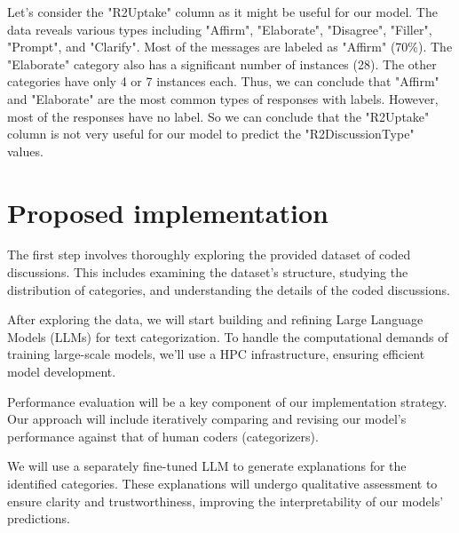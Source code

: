 \documentclass[fleqn,moreauthors,10pt]{ds_report}
\begin{document}


Let’s consider the "R2Uptake" column as it might be useful for our model. The data reveals various types including "Affirm", "Elaborate", "Disagree", "Filler", "Prompt", and "Clarify". Most of the messages are labeled as "Affirm" (70\%). The "Elaborate" category also has a significant number of instances (28). The other categories have only 4 or 7 instances each. Thus, we can conclude that "Affirm" and "Elaborate" are the most common types of responses with labels. However, most of the responses have no label. So we can conclude that the "R2Uptake" column is not very useful for our model to predict the "R2DiscussionType" values.

                                   

\section*{Proposed implementation}

The first step involves thoroughly exploring the provided dataset of coded discussions. This includes examining the dataset's structure, studying the distribution of categories, and understanding the details of the coded discussions.

After exploring the data, we will start building and refining Large Language Models (LLMs) for text categorization. To handle the computational demands of training large-scale models, we'll use a HPC infrastructure, ensuring efficient model development.

Performance evaluation will be a key component of our implementation strategy. Our approach will include iteratively comparing and revising our model's performance against that of human coders (categorizers).

We will use a separately fine-tuned LLM to generate explanations for the identified categories. These explanations will undergo qualitative assessment to ensure clarity and trustworthiness, improving the interpretability of our models' predictions.
\end{document}
